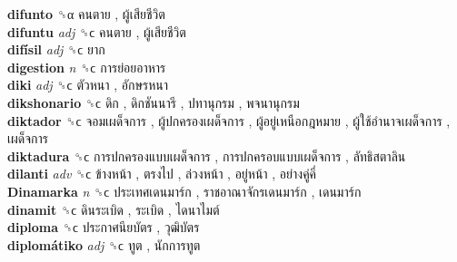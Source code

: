 \textbf{difunto} ␝α   คนตาย ,  ผู้เสียชีวิต   \\
\textbf{difuntu} \emph{adj}  ␝ϲ   คนตาย ,  ผู้เสียชีวิต   \\
\textbf{difísil} \emph{adj}  ␝ϲ   ยาก   \\
\textbf{digestion} \emph{n}  ␝ϲ   การย่อยอาหาร   \\
\textbf{diki} \emph{adj}  ␝ϲ   ตัวหนา ,  อักษรหนา   \\
\textbf{dikshonario} ␝ϲ   ดิก ,  ดิกชันนารี ,  ปทานุกรม ,  พจนานุกรม   \\
\textbf{diktador} ␝ϲ   จอมเผด็จการ ,  ผู้ปกครองเผด็จการ ,  ผู้อยู่เหนือกฎหมาย ,  ผู้ใช้อำนาจเผด็จการ ,  เผด็จการ   \\
\textbf{diktadura} ␝ϲ   การปกครองแบบเผด็จการ ,  การปกครอบแบบเผด็จการ ,  ลัทธิสตาลิน   \\
\textbf{dilanti} \emph{adv}  ␝ϲ   ข้างหน้า ,  ตรงไป ,  ล่วงหน้า ,  อยู่หน้า ,  อย่างคู่คี่   \\
\textbf{Dinamarka} \emph{n}  ␝ϲ   ประเทศเดนมาร์ก ,  ราชอาณาจักรเดนมาร์ก ,  เดนมาร์ก   \\
\textbf{dinamit} ␝ϲ   ดินระเบิด ,  ระเบิด ,  ไดนาไมต์   \\
\textbf{diploma} ␝ϲ   ประกาศนียบัตร ,  วุฒิบัตร   \\
\textbf{diplomátiko} \emph{adj}  ␝ϲ   ทูต ,  นักการทูต   \\
